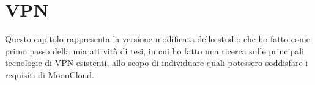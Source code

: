 \chapter{VPN}

Questo capitolo rappresenta la versione modificata dello studio che ho fatto
come primo passo della mia attività di tesi, in cui ho fatto una ricerca
sulle principali tecnologie di VPN esistenti, allo scopo di individuare
quali potessero soddisfare i requisiti di MoonCloud.\\







